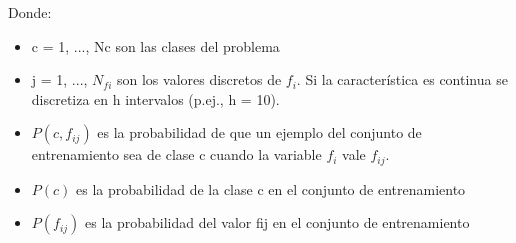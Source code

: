 	Donde:
	\begin{itemize}
		\item c = 1, ..., Nc son las clases del problema
		\item 	j = 1, ..., $N_{fi}$ son los valores discretos de $f_i$. Si la característica es
		continua se discretiza en h intervalos (p.ej., h = 10).
		\item 	$P(c,f_{ij})$ es la probabilidad de que un ejemplo del conjunto de
		entrenamiento sea de clase c cuando la variable $f_i$ vale $f_{ij}$.
		\item 	$P(c)$ es la probabilidad de la clase c en el conjunto de entrenamiento
		\item $P(f_{ij})$ es la probabilidad del valor fij en el conjunto de entrenamiento
	\end{itemize}
	

